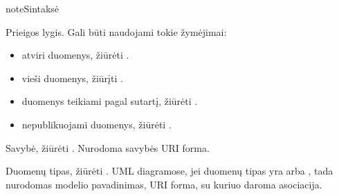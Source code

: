 \documentclass[letterpaper,10pt,lithuanian]{sphinxmanual}
\begin{document}
\begin{sphinxadmonition}{note}{Sintaksė}

\sphinxAtStartPar
{}  \sphinxcode{\sphinxupquote{:}}  \sphinxcode{\sphinxupquote{{[}}}    \sphinxcode{\sphinxupquote{{]}}}
\end{sphinxadmonition}
\begin{description}
\sphinxAtStartPar
Prieigos lygis. Gali būti naudojami tokie žymėjimai:
\begin{itemize}
\item {} 
\sphinxAtStartPar
\sphinxcode{\sphinxupquote{+}} \sphinxhyphen{} atviri duomenys, žiūrėti {\hyperref[\detokenize{prieiga:open}]{}}.

\item {} 
\sphinxAtStartPar
\sphinxcode{\sphinxupquote{\#}} \sphinxhyphen{} vieši duomenys, žiūrįti {\hyperref[\detokenize{prieiga:public}]{}}.

\item {} 
\sphinxAtStartPar
\sphinxcode{\sphinxupquote{\textasciitilde{}}} \sphinxhyphen{} duomenys teikiami pagal sutartį, žiūrėti {\hyperref[\detokenize{prieiga:protected}]{}}.

\item {} 
\sphinxAtStartPar
\sphinxcode{\sphinxupquote{\sphinxhyphen{}}} \sphinxhyphen{} nepublikuojami duomenys, žiūrėti {\hyperref[\detokenize{prieiga:private}]{}}.

\end{itemize}

\sphinxAtStartPar
Savybė, žiūrėti {\hyperref[\detokenize{formatas:property}]{}}. Nurodoma savybės URI forma.

\sphinxAtStartPar
Duomenų tipas, žiūrėti {\hyperref[\detokenize{tipai:duomenu-tipai}]{}}. UML diagramose, jei duomenų
tipas yra {\hyperref[\detokenize{formatas:ref}]{}} arba , tada nurodomas modelio
pavadinimas, URI forma, su kuriuo daroma asociacija.


\end{description}
\end{document}
